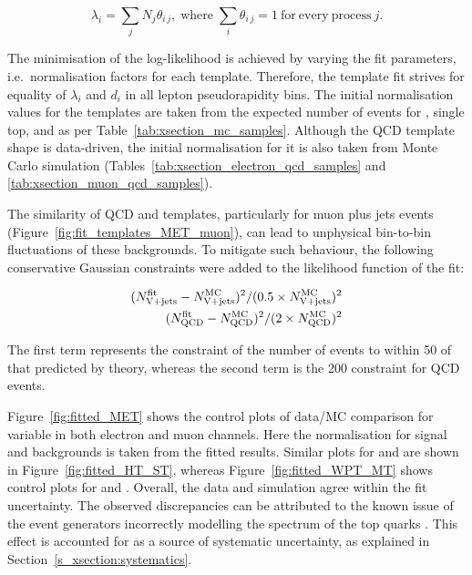 \begin{equation}
\label{eq:xsection_templates_normalisation}
\lambda_i=\sum\limits_{j}N_j\theta_{i\,j},\;\mathrm{where}\;\sum\limits_{i}\theta_{i\,j}=1~\mathrm{for~every~process}~j.
\end{equation}

The minimisation of the log-likelihood is achieved by varying the fit parameters, i.e.\ normalisation factors for each
template. Therefore, the template fit strives for equality of $\lambda_i$ and $d_i$ in all lepton pseudorapidity bins.
The initial normalisation values for the templates are taken from the expected number of events for \ttbar, single top,
\WpJets and \ZpJets as per Table~\ref{tab:xsection_mc_samples}. Although the QCD template shape is data-driven, the
initial normalisation for it is also taken from Monte Carlo simulation (Tables~\ref{tab:xsection_electron_qcd_samples}
and \ref{tab:xsection_muon_qcd_samples}).

The similarity of QCD and \VpJets templates, particularly for muon plus jets events
(Figure~\ref{fig:fit_templates_MET_muon}), can lead to unphysical bin-to-bin fluctuations of these backgrounds. To
mitigate such behaviour, the following conservative Gaussian constraints were added to the likelihood function of the
fit:

\begin{align}
\label{eq:xsection_fit_constraints}
(N_{\mathrm{V}+\textrm{jets}}^\mathrm{fit}-N_{\mathrm{V}+\textrm{jets}}^\mathrm{MC})^2/(0.5 \times N_{\mathrm{V}+\textrm{jets}}^\mathrm{MC})^2 \\
(N_\mathrm{QCD}^\mathrm{fit}-N_\mathrm{QCD}^\mathrm{MC})^2/(2\times N_\mathrm{QCD}^\mathrm{MC})^2
\end{align}

The first term represents the constraint of the number of \VpJets events to within \SI{50}{\pc} of that predicted by
theory, whereas the second term is the \SI{200}{\pc} constraint for QCD events.

Figure~\ref{fig:fitted_MET} shows the control plots of data/MC comparison for \MET variable in both electron and muon
channels. Here the normalisation for signal and backgrounds is taken from the fitted results. Similar plots for \HT and
\ST are shown in Figure~\ref{fig:fitted_HT_ST}, whereas Figure~\ref{fig:fitted_WPT_MT} shows control plots for \WPT and
\MT. Overall, the data and simulation agree within the fit uncertainty. The observed discrepancies can be attributed to
the known issue of the event generators incorrectly modelling the \pt spectrum of the top quarks
\autocite{ttbar_differential_xsection_7TeV, ttbar_differential_xsection_8TeV}. This effect is accounted for as a source
of systematic uncertainty, as explained in Section~\ref{s_xsection:systematics}.

